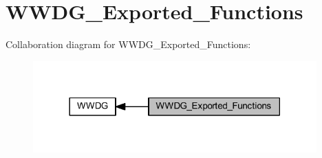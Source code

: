 \hypertarget{group___w_w_d_g___exported___functions}{}\section{W\+W\+D\+G\+\_\+\+Exported\+\_\+\+Functions}
\label{group___w_w_d_g___exported___functions}
Collaboration diagram for W\+W\+D\+G\+\_\+\+Exported\+\_\+\+Functions\+:
\nopagebreak
\begin{figure}[H]
\begin{center}
\leavevmode
\includegraphics[width=309pt]{group___w_w_d_g___exported___functions}
\end{center}
\end{figure}

